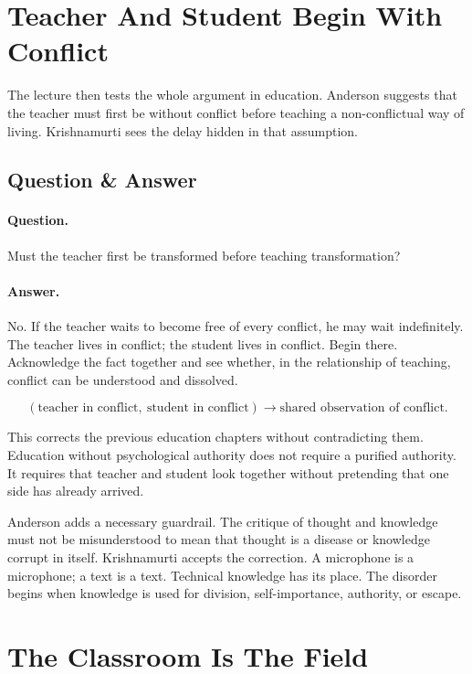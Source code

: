\documentclass[11pt,oneside]{book}
\begin{document}
\section{Teacher And Student Begin With Conflict}

The lecture then tests the whole argument in education. Anderson suggests that the teacher must first be without conflict before teaching a non-conflictual way of living. Krishnamurti sees the delay hidden in that assumption.

\subsection{Question \& Answer}

\paragraph{Question.}
Must the teacher first be transformed before teaching transformation?

\paragraph{Answer.}
No. If the teacher waits to become free of every conflict, he may wait indefinitely. The teacher lives in conflict; the student lives in conflict. Begin there. Acknowledge the fact together and see whether, in the relationship of teaching, conflict can be understood and dissolved.

\begin{equation}
(\text{teacher in conflict},\ \text{student in conflict})
\longrightarrow
\text{shared observation of conflict}.
\end{equation}

This corrects the previous education chapters without contradicting them. Education without psychological authority does not require a purified authority. It requires that teacher and student look together without pretending that one side has already arrived.

Anderson adds a necessary guardrail. The critique of thought and knowledge must not be misunderstood to mean that thought is a disease or knowledge corrupt in itself. Krishnamurti accepts the correction. A microphone is a microphone; a text is a text. Technical knowledge has its place. The disorder begins when knowledge is used for division, self-importance, authority, or escape.

\section{The Classroom Is The Field}
\end{document}
